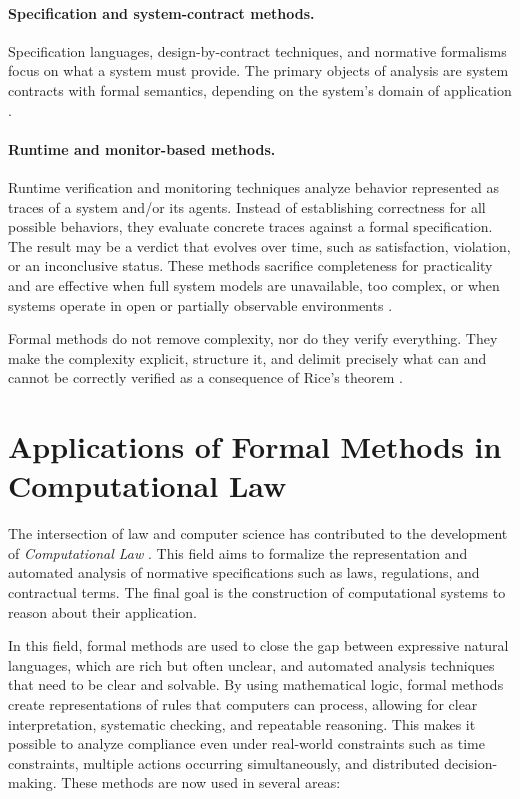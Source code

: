 \paragraph{Specification and system-contract methods.}

Specification languages, design-by-contract techniques, and normative formalisms focus on what a system must provide. The primary objects of analysis are system contracts with formal semantics, depending on the system's domain of application \cite{DBLP:phd/us/Romeo22,DBLP:journals/fteda/BenvenisteCNPRR18}.

\paragraph{Runtime and monitor-based methods.}

Runtime verification and monitoring techniques analyze behavior represented as traces of a system and/or its agents. Instead of establishing correctness for all possible behaviors, they evaluate concrete traces against a formal specification. The result may be a verdict that evolves over time, such as satisfaction, violation, or an inconclusive status. These methods sacrifice completeness for practicality and are effective when full system models are unavailable, too complex, or when systems operate in open or partially observable environments \cite{DBLP:journals/jlp/LeuckerS09,bartocci2018rv}.

Formal methods do not remove complexity, nor do they verify everything. They make the complexity explicit, structure it, and delimit precisely what can and cannot be correctly verified as a consequence of Rice's theorem \cite{rice1953classes}.

\section{Applications of Formal Methods in Computational Law}

The intersection of law and computer science has contributed to the development of \emph{Computational Law} \cite{love2005computational}. This field aims to formalize the representation and automated analysis of normative specifications such as laws, regulations, and contractual terms. The final goal is the construction of computational systems to reason about their application.

In this field, formal methods are used to close the gap between expressive natural languages, which are rich but often unclear, and automated analysis techniques that need to be clear and solvable. By using mathematical logic, formal methods create representations of rules that computers can process, allowing for clear interpretation, systematic checking, and repeatable reasoning. This makes it possible to analyze compliance even under real-world constraints such as time constraints, multiple actions occurring simultaneously, and distributed decision-making. These methods are now used in several areas:

